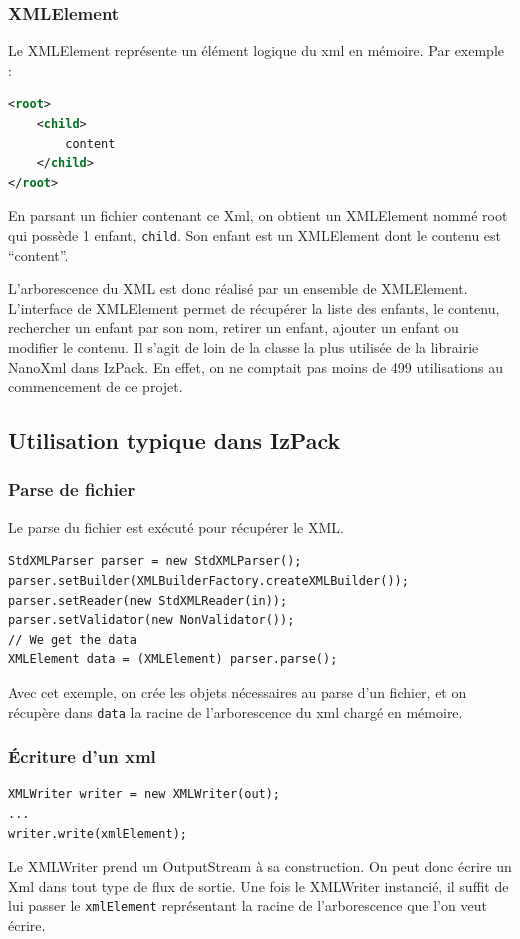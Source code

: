 \subsubsection{XMLElement}
Le XMLElement représente un élément logique du xml en mémoire. Par exemple :
\begin{lstlisting}[language=xml]
<root>
	<child>
		content
	</child>
</root>
\end{lstlisting}
En parsant un fichier contenant ce Xml, on obtient un XMLElement nommé root qui possède 1 enfant, \verb|child|. Son enfant est un XMLElement dont le contenu est ``content''.

L'arborescence du XML est donc réalisé par un ensemble de XMLElement.
L'interface de XMLElement permet de récupérer la liste des enfants, le contenu, rechercher un enfant par son nom, retirer un enfant, ajouter un enfant ou modifier le contenu.
Il s'agit de loin de la classe la plus utilisée de la librairie NanoXml dans IzPack.
En effet, on ne comptait pas moins de 499 utilisations au commencement de ce projet.

\subsection{Utilisation typique dans IzPack}
\subsubsection{Parse de fichier}
Le parse du fichier est exécuté pour récupérer le XML.
\begin{lstlisting}
StdXMLParser parser = new StdXMLParser();
parser.setBuilder(XMLBuilderFactory.createXMLBuilder());
parser.setReader(new StdXMLReader(in));
parser.setValidator(new NonValidator());
// We get the data
XMLElement data = (XMLElement) parser.parse();
\end{lstlisting}
Avec cet exemple, on crée les objets nécessaires au parse d'un fichier, et on récupère dans \verb|data| la racine de l'arborescence du xml chargé en mémoire.
\subsubsection{Écriture d'un xml}
\begin{lstlisting}
XMLWriter writer = new XMLWriter(out);
...
writer.write(xmlElement);
\end{lstlisting}
Le XMLWriter prend un OutputStream à sa construction.
On peut donc écrire un Xml dans tout type de flux de sortie. 
Une fois le XMLWriter instancié, il suffit de lui passer le \verb|xmlElement| représentant la racine de l'arborescence que l'on veut écrire.
